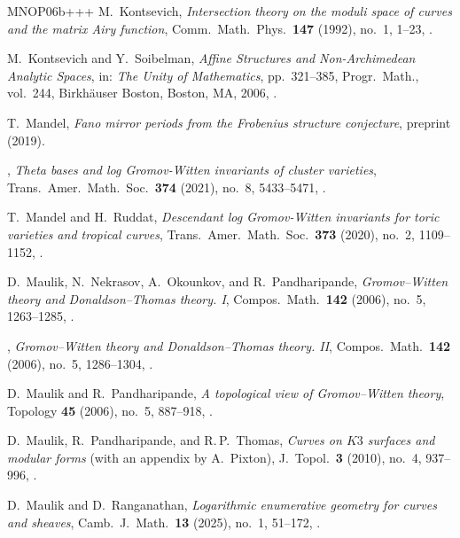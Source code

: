 \documentclass[11pt]{amsart}
\numberwithin{equation}{section}
\theoremstyle{plain}
\theoremstyle{remark}
\theoremstyle{definition}
\begin{document}
\begin{thebibliography}{MNOP06b+++}
M.~Kontsevich, \emph{Intersection theory on the moduli space of curves and the
  matrix Airy function}, Comm.\ Math.\ Phys.\ \textbf{147} (1992), no.~1, 
1--23, .
  
M.~Kontsevich and Y.~Soibelman, \emph{Affine Structures and Non-{A}rchimedean
  Analytic Spaces}, in: \emph{The Unity of Mathematics}, pp.~321--385, Progr.\ Math., vol.~244, Birkh\"{a}user Boston, Boston, MA, 2006, .

T.~Mandel, \emph{Fano mirror periods from the Frobenius structure conjecture},
   preprint  (2019).

\bysame, \emph{Theta bases and log {G}romov-{W}itten invariants of cluster
  varieties}, Trans.\ Amer.\ Math.\ Soc.\ \textbf{374} (2021), no.~8, 
5433--5471,  .

T.~Mandel and H.~Ruddat, \emph{Descendant log {G}romov-{W}itten invariants for
  toric varieties and tropical curves}, Trans.\ Amer.\ Math.\ Soc.\ \textbf{373}
  (2020), no.~2, 1109--1152, .

D.~Maulik, N.~Nekrasov, A.~Okounkov, and R.~Pandharipande,
  \emph{Gromov--{W}itten theory and {D}onaldson--{T}homas theory. {I}}, Compos.\
  Math.\ \textbf{142} (2006), no.~5, 1263--1285,
  .

\bysame, \emph{Gromov--{W}itten theory and {D}onaldson--{T}homas theory. {II}},
  Compos.\ Math.\ \textbf{142} (2006), no.~5, 
1286--1304,  .

D.~Maulik and R.~Pandharipande, \emph{A topological view of {G}romov--{W}itten
  theory}, Topology \textbf{45} (2006), no.~5, 
887--918,  .

D.~Maulik, R.~Pandharipande, and R.\,P.~Thomas, \emph{Curves on {$K3$} surfaces
  and modular forms} (with an appendix by A.~Pixton), J.~Topol.\ \textbf{3} (2010), no.~4, 937--996, .

D.~Maulik and D.~Ranganathan, \emph{Logarithmic enumerative geometry for curves
and sheaves}, Camb.~J.\ Math.\ \textbf{13} (2025), no.~1, 51--172, .


\end{thebibliography}
\end{document}
